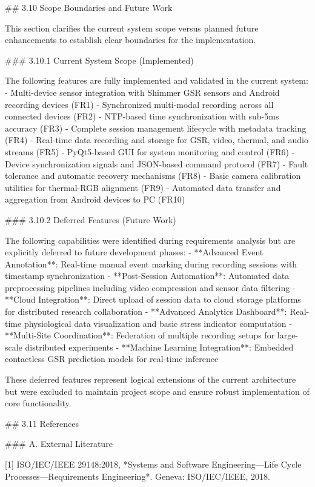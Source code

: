 \documentclass[12pt,a4paper]{article}
\begin{document}
{## 3.10 Scope Boundaries and Future Work

This section clarifies the current system scope versus planned future enhancements to establish clear boundaries for the implementation.

### 3.10.1 Current System Scope (Implemented)

The following features are fully implemented and validated in the current system:
- Multi-device sensor integration with Shimmer GSR sensors and Android recording devices (FR1)
- Synchronized multi-modal recording across all connected devices (FR2)
- NTP-based time synchronization with sub-5ms accuracy (FR3)
- Complete session management lifecycle with metadata tracking (FR4)
- Real-time data recording and storage for GSR, video, thermal, and audio streams (FR5)
- PyQt5-based GUI for system monitoring and control (FR6)
- Device synchronization signals and JSON-based command protocol (FR7)
- Fault tolerance and automatic recovery mechanisms (FR8)
- Basic camera calibration utilities for thermal-RGB alignment (FR9)
- Automated data transfer and aggregation from Android devices to PC (FR10)

### 3.10.2 Deferred Features (Future Work)

The following capabilities were identified during requirements analysis but are explicitly deferred to future development phases:
- **Advanced Event Annotation**: Real-time manual event marking during recording sessions with timestamp synchronization
- **Post-Session Automation**: Automated data preprocessing pipelines including video compression and sensor data filtering
- **Cloud Integration**: Direct upload of session data to cloud storage platforms for distributed research collaboration
- **Advanced Analytics Dashboard**: Real-time physiological data visualization and basic stress indicator computation
- **Multi-Site Coordination**: Federation of multiple recording setups for large-scale distributed experiments
- **Machine Learning Integration**: Embedded contactless GSR prediction models for real-time inference

These deferred features represent logical extensions of the current architecture but were excluded to maintain project scope and ensure robust implementation of core functionality.

## 3.11 References

### A. External Literature

[1] ISO/IEC/IEEE 29148:2018, *Systems and Software Engineering—Life Cycle Processes—Requirements Engineering*. Geneva: ISO/IEC/IEEE, 2018.

}
\end{document}
